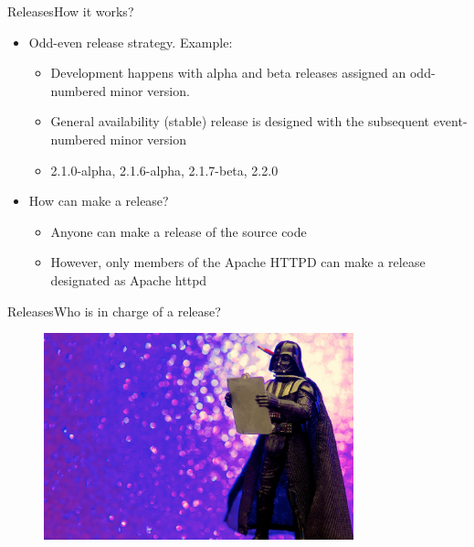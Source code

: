 \documentclass[10pt]{beamer}
\begin{document}
\begin{frame}{Releases}{How it works?}
  \begin{itemize}
    \item Odd-even release strategy. Example: \pause
    \begin{itemize}
      \item Development happens with alpha and beta releases assigned an
            odd-numbered minor version. \pause
      \item General availability (stable) release is designed with the
            subsequent event-numbered minor version \pause
      \item 2.1.0-alpha, 2.1.6-alpha, 2.1.7-beta, 2.2.0 \pause
    \end{itemize}

    \item How can make a release? \pause
      \begin{itemize}
        \item Anyone can make a release of the source code \pause
        \item However, only members of the Apache HTTPD can make a release
              designated as Apache httpd
      \end{itemize}
  \end{itemize}
\end{frame}

\begin{frame}{Releases}{Who is in charge of a release?}
  \begin{figure}[ht]
    \centering
    \includegraphics[width=0.8\textwidth, keepaspectratio=true]{images/rm.jpg}
  \end{figure}
\end{frame}
\end{document}
